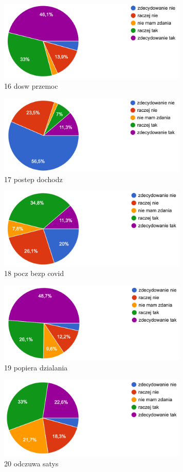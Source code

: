 \begin{figure}
    \includegraphics[width=9cm]{wyniki/16_dosw_przemoc}
    \caption{ 16 dosw przemoc }
\end{figure}

\begin{figure}
    \includegraphics[width=9cm]{wyniki/17_postep_dochodz}
    \caption{ 17 postep dochodz }
\end{figure}

\begin{figure}
    \includegraphics[width=9cm]{wyniki/18_pocz_bezp_covid}
    \caption{ 18 pocz bezp covid }
\end{figure}

\begin{figure}
    \includegraphics[width=9cm]{wyniki/19_popiera_dzialania}
    \caption{ 19 popiera dzialania }
\end{figure}

\begin{figure}
    \includegraphics[width=9cm]{wyniki/20_odczuwa_satys}
    \caption{ 20 odczuwa satys }
\end{figure}